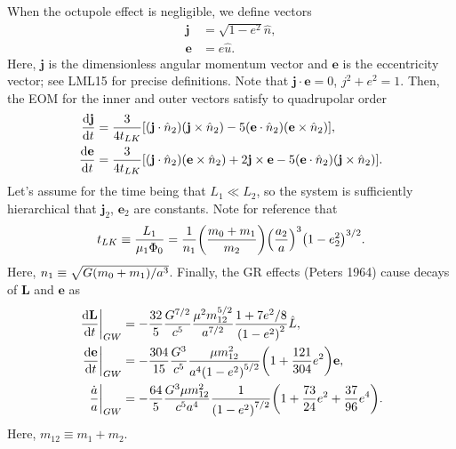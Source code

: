 \documentclass[11pt,
        usenames, %
        dvipsnames %
    ]{article}
\newcommand*{\rd}[2]{\frac{\mathrm{d}#1}{\mathrm{d}#2}}
\newcommand*{\bm}[1]{\boldsymbol{\mathbf{#1}}}
\newcommand*{\at}[1]{\left.#1\right|}
\DeclarePairedDelimiter\p{\lparen}{\rparen}
\DeclarePairedDelimiter\s{\lbrack}{\rbrack}
\begin{document}
When the octupole effect is negligible, we define vectors
\begin{align}
    \bm{j} &= \sqrt{1 - e^2}\hat{n},\\
    \bm{e} &= e\hat{u}.
\end{align}
Here, $\bm{j}$ is the dimensionless angular momentum vector and $\bm{e}$ is the
eccentricity vector; see LML15 for precise definitions. Note that $\bm{j} \cdot
\bm{e} = 0$, $j^2 + e^2 = 1$. Then, the EOM for the inner and outer vectors
satisfy to quadrupolar order
\begin{align}
    \rd{\bm{j}}{t} &= \frac{3}{4t_{LK}} \s*{
        \p*{\bm{j} \cdot \hat{n}_2} \p*{\bm{j} \times \hat{n}_2}
        - 5\p*{\bm{e} \cdot \hat{n}_2}\p*{\bm{e} \times \hat{n}_2}
        },\\
    \rd{\bm{e}}{t} &= \frac{3}{4t_{LK}} \s*{
        \p*{\bm{j} \cdot \hat{n}_2} \p*{\bm{e} \times \hat{n}_2}
        + 2\bm{j} \times \bm{e}
        - 5\p*{\bm{e} \cdot \hat{n}_2}\p*{\bm{j} \times \hat{n}_2}
        }.
\end{align}
Let's assume for the time being that $L_1 \ll L_2$, so the system is
sufficiently hierarchical that $\bm{j}_2$, $\bm{e}_2$ are constants. Note for
reference that
\begin{equation}
    t_{LK} \equiv \frac{L_1}{\mu_1 \Phi_0}
        = \frac{1}{n_1}\p*{\frac{m_0 + m_1}{m_2}}
            \p*{\frac{a_2}{a}}^3
            \p*{1 - e_2^2}^{3/2}.
\end{equation}
Here, $n_1 \equiv \sqrt{G\p*{m_0 + m_1}/a^3}$. Finally, the GR effects
(Peters 1964) cause decays of $\bm{L}$ and $\bm{e}$ as
\begin{align}
    \at{\rd{\bm{L}}{t}}_{GW} &= -\frac{32}{5}\frac{G^{7/2}}{c^5}
        \frac{\mu^2 m_{12}^{5/2}}{a^{7/2}}
        \frac{1 + 7e^2/8}{\p*{1 - e^2}^2}\hat{L},\\
    \at{\rd{\bm{e}}{t}}_{GW} &= -\frac{304}{15} \frac{G^3}{c^5}
        \frac{\mu m_{12}^2}{a^4\p*{1 - e^2}^{5/2}}\p*{1 + \frac{121}{304}
            e^2}\bm{e},\\
    \at{\frac{\dot{a}}{a}}_{GW} &= -\frac{64}{5} \frac{G^3 \mu m_{12}^2}{c^5a^4}
        \frac{1}{\p*{1 - e^2}^{7/2}}\p*{1 + \frac{73}{24}e^2
            + \frac{37}{96}e^4}.
\end{align}
Here, $m_{12} \equiv m_1 + m_2$.
\end{document}
